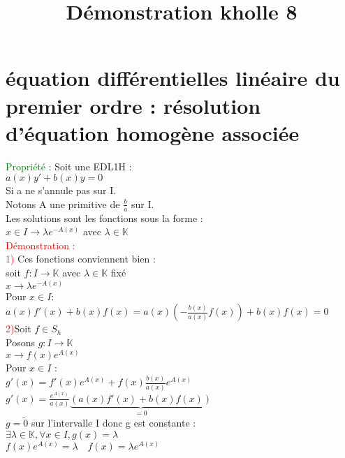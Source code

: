 \documentclass{article}
\begin{document}
\title{Démonstration kholle 8}
\date{}
\maketitle
	\renewcommand{\thesection}{\Roman{section}}
	\setlength{\parindent}{1.5cm}
	\section{équation différentielles linéaire du premier ordre : résolution d'équation homogène associée}
	\textcolor{green}{Propriété :}
	Soit une EDL1H : \\
	$a(x)y'+b(x)y=0$ \\ 
	Si a ne s'annule pas sur I. \\
	Notons A une primitive de $\frac{b}{a}$ sur I. \\
	Les solutions sont les fonctions sous la forme : \\ 
	$x \in I \rightarrow \lambda e^{-A(x)}$ avec $\lambda \in \mathbb{K}$ \\ 
	\textcolor{red}{Démonstration :} \\ 
	\textcolor{red}{1)} Ces fonctions conviennent bien : \\ 
	soit $f : I \rightarrow \mathbb{K}$ avec $\lambda \in \mathbb{K}$ fixé \\ 
	\indent $x \rightarrow \lambda e^{-A(x)}$ \\ 
	Pour $x \in I$: \\ 
	$a(x)f'(x)+b(x)f(x)= a(x)(-\frac{b(x)}{a(x)}f(x))+ b(x)f(x) =0$ \\ 
	\textcolor{red}{2)}Soit $f \in S_h$ \\ 
	Posons $g: I \rightarrow \mathbb{K}$ \\ 
	\indent $x \rightarrow f(x)e^{A(x)}$ \\ 
	Pour $x \in I$ : \\ 
	$g'(x)=f'(x)e^{A(x)}+f(x)\frac{b(x)}{a(x)}e^{A(x)}$ \\ 
	$g'(x)=\frac{e^{A(x)}}{a(x)}\underbrace{(a(x)f'(x)+b(x)f(x))}_{=0}$ \\ 
	$g=\tilde{0}$ sur l'intervalle I donc g est constante : \\
	$\exists \lambda \in \mathbb{K}, \forall x \in I, g(x)=\lambda$ \\ 
	$f(x)e^{A(x)}=\lambda \quad f(x)=\lambda e^{A(x)}$
\end{document}
